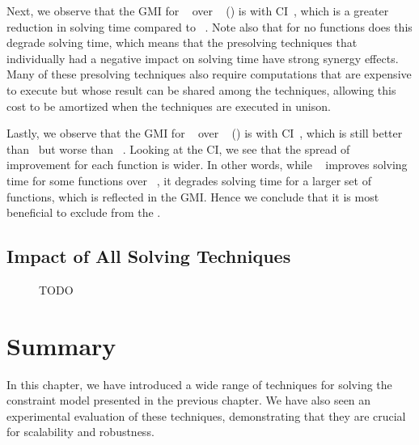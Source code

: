 Next, we observe that the \gls{GMI} for ~\modelE{}
over ~\modelC{}
() is \printGMI{%
  \SolvTechDisableBadPresolvingPrePlusSolvingTimeSpeedupPrePlusSolvingTimeRegularSpeedupGmean%
} with \gls{CI}~\printGMICI{%
  \SolvTechDisableBadPresolvingPrePlusSolvingTimeSpeedupPrePlusSolvingTimeRegularSpeedupCiMin%
}{%
  \SolvTechDisableBadPresolvingPrePlusSolvingTimeSpeedupPrePlusSolvingTimeRegularSpeedupCiMax%
}, which is a greater reduction in solving time compared to ~\modelD.
%
Note also that for no \glspl{function} does this 
degrade solving time, which means that the \gls{presolving} techniques that
individually had a negative impact on solving time have strong synergy effects.
%
Many of these \gls{presolving} techniques also require computations that are
expensive to execute but whose result can be shared among the techniques,
allowing this cost to be amortized when the techniques are executed in unison.

Lastly, we observe that the \gls{GMI} for ~\modelF{}
over ~\modelC{}
() is \printGMI{%
  \SolvTechDisableAllPresolvingPrePlusSolvingTimeSpeedupPrePlusSolvingTimeRegularSpeedupGmean%
} with \gls{CI}~\printGMICI{%
  \SolvTechDisableAllPresolvingPrePlusSolvingTimeSpeedupPrePlusSolvingTimeRegularSpeedupCiMin%
}{%
  \SolvTechDisableAllPresolvingPrePlusSolvingTimeSpeedupPrePlusSolvingTimeRegularSpeedupCiMax%
}, which is still better than ~\modelD but worse than
~\modelE.
%
Looking at the \gls{CI}, we see that the spread of improvement for each
\gls{function} is wider.
%
In other words, while ~\modelF{} improves solving
time for some \glspl{function} over ~\modelE, it
degrades solving time for a larger set of \glspl{function}, which is reflected
in the \gls{GMI}.
%
Hence we conclude that it is most beneficial to exclude
 from the
.


\subsection{Impact of All Solving Techniques}

\begin{figure}
  \centering%

  \caption{TODO}
\end{figure}


\section{Summary}

In this chapter, we have introduced a wide range of techniques for solving the
\gls{constraint model} presented in the previous chapter.
%
We have also seen an experimental evaluation of these techniques, demonstrating
that they are crucial for scalability and robustness.
